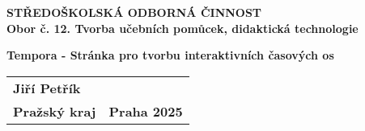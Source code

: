 \renewcommand{\cftsecleader}{\cftdotfill{\cftdotsep}}
\begin{center}
    \textbf{\large STŘEDOŠKOLSKÁ ODBORNÁ ČINNOST} \\[1cm]
    \textbf{Obor č. 12. Tvorba učebních pomůcek, didaktická technologie}
    
\end{center}

\vfill

\begin{center}
    \textbf{\Large {Tempora - Stránka pro tvorbu interaktivních časových os}}
\end{center}

\vfill

\begin{tabular}{p{} p{}}
    \textbf{{Jiří Petřík}} \\[0.2cm]
    \textbf{Pražský kraj} & 
    \textbf{{Praha 2025}}
\end{tabular}

